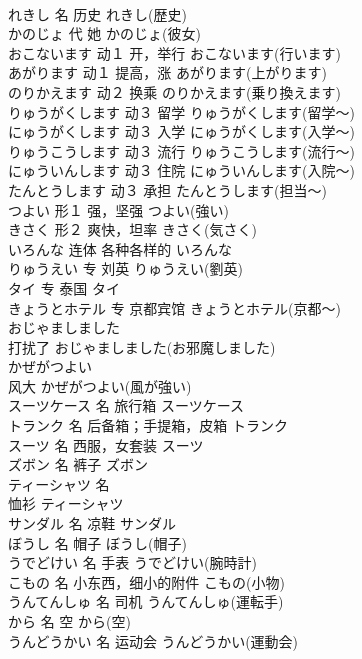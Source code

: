 \documentclass[8pt]{extreport}
\begin{document}
\begin{CJK}{UTF8}{min}
\\	れきし	名	历史	れきし(歴史)	
\\	かのじょ	代	她	かのじょ(彼女)	
\\	おこないます	动１	开，举行	おこないます(行います)	
\\	あがります	动１	提高，涨	あがります(上がります)	
\\	のりかえます	动２	换乘	のりかえます(乗り換えます)	
\\	りゅうがくします	动３	留学	りゅうがくします(留学～)	
\\	にゅうがくします	动３	入学	にゅうがくします(入学～)	
\\	りゅうこうします	动３	流行	りゅうこうします(流行～)	
\\	にゅういんします	动３	住院	にゅういんします(入院～)	
\\	たんとうします	动３	承担	たんとうします(担当～)	
\\	つよい	形１	强，坚强	つよい(強い)	
\\	きさく	形２	爽快，坦率	きさく(気さく)	
\\	いろんな	连体	各种各样的	いろんな	
\\	りゅうえい	专	刘英	りゅうえい(劉英)	
\\	タイ	专	泰国	タイ	
\\	きょうとホテル	专	京都宾馆	きょうとホテル(京都～)	
\\	おじゃましました	
\\	打扰了	おじゃましました(お邪魔しました)	
\\	かぜがつよい	
\\	风大	かぜがつよい(風が強い)	
\\	スーツケース	名	旅行箱	スーツケース	
\\	トランク	名	后备箱；手提箱，皮箱	トランク	
\\	スーツ	名	西服，女套装	スーツ	
\\	ズボン	名	裤子	ズボン	
\\	ティーシャツ	名	
\\	恤衫	ティーシャツ
\\	サンダル	名	凉鞋	サンダル	
\\	ぼうし	名	帽子	ぼうし(帽子)	
\\	うでどけい	名	手表	うでどけい(腕時計)	
\\	こもの	名	小东西，细小的附件	こもの(小物)	
\\	うんてんしゅ	名	司机	うんてんしゅ(運転手)	
\\	から	名	空	から(空)	
\\	うんどうかい	名	运动会	うんどうかい(運動会)	

\end{CJK}
\end{document}
